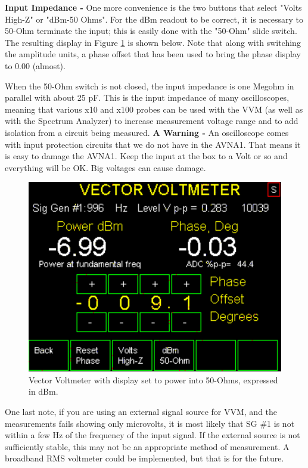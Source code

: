 \textbf{Input Impedance - }One more convenience is the two buttons that select "\textsf{Volts High-Z}" or "\textsf{dBm-50 Ohms}".  For the  dBm readout to be correct, it is necessary to 50-Ohm terminate the input; this is easily done with the "50-Ohm" slide switch.  The resulting display  in Figure  \ref{AVNA_018-label} is shown below.  Note that along with switching the amplitude units,  a phase offset that has been used to bring the phase display to 0.00 (almost).

When the 50-Ohm switch is not closed, the input impedance is one Megohm in parallel with about 25 pF.  This is the input impedance of many oscilloscopes, meaning that  various x10 and x100 probes can be used with the VVM (as well as with the Spectrum Analyzer) to increase measurement voltage range and to add isolation from a circuit being measured. \textbf{A Warning - }An oscilloscope comes with input protection circuits that we do not have in the AVNA1. That means it is easy to damage the AVNA1. Keep the input at the box to a Volt or so and everything will be OK. Big voltages can cause damage. 
%
\begin{figure}[H]
\begin{center}
\includegraphics[scale=0.75]{./images/AVNA_018.pdf}
\caption{Vector Voltmeter with display set to power into 50-Ohms, expressed in dBm.}
\label{AVNA_018-label}
\end{center}
\end{figure}
%

One last note, if you are using an external signal source for VVM, and the measurements fails showing only microvolts, it is most likely that SG \#1 is not within a few Hz of the frequency of the input signal.  If the external source is not sufficiently stable, this may not be an appropriate method of measurement.  A broadband RMS voltmeter could be implemented, but that is for the future.

